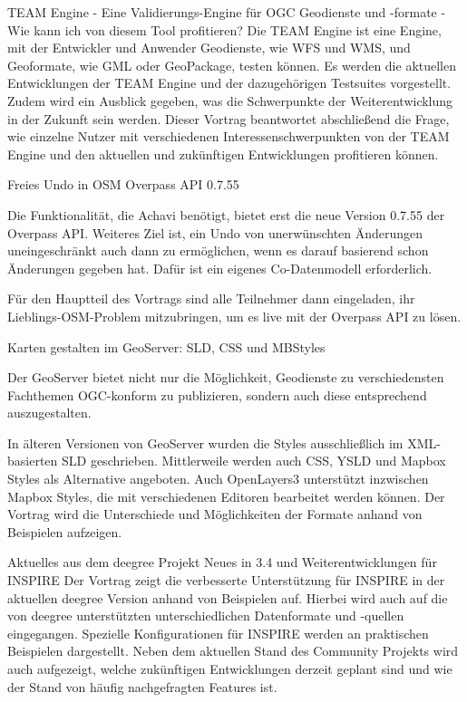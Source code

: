 %
{TEAM Engine - Eine Validierungs-Engine für OGC Geodienste und -formate - Wie kann ich von diesem Tool profitieren?}%
{}%
{%
Die TEAM Engine ist eine Engine, mit der Entwickler und Anwender Geodienste, wie WFS und WMS, und Geoformate, wie GML oder GeoPackage, testen können.
Es werden die aktuellen Entwicklungen der TEAM Engine und der dazugehörigen Testsuites vorgestellt. Zudem wird ein Ausblick gegeben, was die Schwerpunkte der Weiterentwicklung in der Zukunft sein werden.
Dieser Vortrag beantwortet abschließend die Frage, wie einzelne Nutzer mit verschiedenen Interessenschwerpunkten von der TEAM Engine und den aktuellen und zukünftigen Entwicklungen profitieren können.%
}

%
{Freies Undo in OSM}%
{Overpass API 0.7.55}%
{%
Die Funktionalität, die Achavi benötigt, bietet erst die neue Version 0.7.55 der Overpass API. Weiteres Ziel ist, ein Undo von unerwünschten Änderungen uneingeschränkt auch dann zu ermöglichen, wenn es darauf basierend schon Änderungen gegeben hat. Dafür ist ein eigenes Co-Datenmodell erforderlich.

Für den Hauptteil des Vortrags sind alle Teilnehmer dann eingeladen, ihr Lieblings-OSM-Problem mitzubringen, um es live mit der Overpass API zu lösen.%
}

%
{Karten gestalten im GeoServer: SLD, CSS und MBStyles}%
{}%
{%
Der GeoServer bietet nicht nur die Möglichkeit, Geodienste zu verschiedensten Fachthemen OGC-konform zu publizieren, sondern auch diese entsprechend auszugestalten.

In älteren Versionen von GeoServer wurden die Styles ausschließlich im XML-basierten SLD geschrieben. Mittlerweile werden auch CSS, YSLD und Mapbox Styles als Alternative angeboten.
Auch OpenLayers3 unterstützt inzwischen Mapbox Styles, die mit verschiedenen Editoren bearbeitet werden können.
Der Vortrag wird die Unterschiede und Möglichkeiten der Formate anhand von Beispielen aufzeigen.%
}

%
{Aktuelles aus dem deegree Projekt}%
{Neues in 3.4 und Weiterentwicklungen für INSPIRE }%
{%
Der Vortrag zeigt die verbesserte Unterstützung für INSPIRE in der aktuellen deegree Version anhand von Beispielen auf. Hierbei wird auch auf die von deegree unterstützten unterschiedlichen Datenformate und -quellen eingegangen. Spezielle Konfigurationen für INSPIRE werden an praktischen Beispielen dargestellt. Neben dem aktuellen Stand des Community Projekts wird auch aufgezeigt, welche zukünftigen Entwicklungen derzeit geplant sind und wie der Stand von häufig nachgefragten Features ist.%
}


